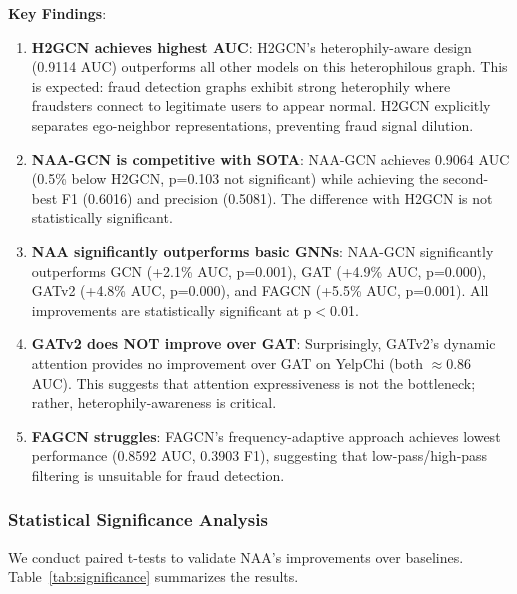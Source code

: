 \textbf{Key Findings}:

\begin{enumerate}
\item \textbf{H2GCN achieves highest AUC}: H2GCN's heterophily-aware design (0.9114 AUC) outperforms all other models on this heterophilous graph. This is expected: fraud detection graphs exhibit strong heterophily where fraudsters connect to legitimate users to appear normal. H2GCN explicitly separates ego-neighbor representations, preventing fraud signal dilution.

\item \textbf{NAA-GCN is competitive with SOTA}: NAA-GCN achieves 0.9064 AUC (0.5\% below H2GCN, p=0.103 not significant) while achieving the second-best F1 (0.6016) and precision (0.5081). The difference with H2GCN is not statistically significant.

\item \textbf{NAA significantly outperforms basic GNNs}: NAA-GCN significantly outperforms GCN (+2.1\% AUC, p=0.001), GAT (+4.9\% AUC, p=0.000), GATv2 (+4.8\% AUC, p=0.000), and FAGCN (+5.5\% AUC, p=0.001). All improvements are statistically significant at p$<$0.01.

\item \textbf{GATv2 does NOT improve over GAT}: Surprisingly, GATv2's dynamic attention provides no improvement over GAT on YelpChi (both $\approx$0.86 AUC). This suggests that attention expressiveness is not the bottleneck; rather, heterophily-awareness is critical.

\item \textbf{FAGCN struggles}: FAGCN's frequency-adaptive approach achieves lowest performance (0.8592 AUC, 0.3903 F1), suggesting that low-pass/high-pass filtering is unsuitable for fraud detection.
\end{enumerate}

\subsubsection{Statistical Significance Analysis}

We conduct paired t-tests to validate NAA's improvements over baselines. Table~\ref{tab:significance} summarizes the results.

